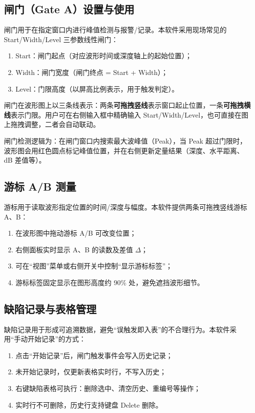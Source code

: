 \subsection{闸门（Gate A）设置与使用}
\par
闸门用于在指定窗口内进行峰值检测与报警/记录。本软件采用现场常见的 Start/Width/Level 三参数线性闸门：
\begin{enumerate}
	\item Start：闸门起点（对应波形时间或深度轴上的起始位置）；
	\item Width：闸门宽度（闸门终点 = Start + Width）；
	\item Level：门限高度（以屏高比例表示，用于触发判定）。
\end{enumerate}
\par
闸门在波形图上以三条线表示：两条\textbf{可拖拽竖线}表示窗口起止位置，一条\textbf{可拖拽横线}表示门限。用户可在右侧输入框中精确输入 Start/Width/Level，也可直接在图上拖拽调整，二者会自动联动。
\par
闸门检测逻辑为：在闸门窗口内搜索最大波峰值（Peak），当 Peak 超过门限时，波形图会用红色圆点标记峰值位置，并在右侧更新定量结果（深度、水平距离、dB 差值等）。


\subsection{游标 A/B 测量}
\par
游标用于读取波形指定位置的时间/深度与幅度。本软件提供两条可拖拽竖线游标 A、B：
\begin{enumerate}
	\item 在波形图中拖动游标 A/B 可改变位置；
	\item 右侧面板实时显示 A、B 的读数及差值 $\Delta$；
	\item 可在“视图”菜单或右侧开关中控制“显示游标标签”；
	\item 游标标签固定显示在图形高度约 90\% 处，避免遮挡波形细节。
\end{enumerate}


\subsection{缺陷记录与表格管理}
\par
缺陷记录用于形成可追溯数据，避免“误触发即入表”的不合理行为。本软件采用“手动开始记录”的方式：
\begin{enumerate}
	\item 点击“开始记录”后，闸门触发事件会写入历史记录；
	\item 未开始记录时，仅更新表格实时行，不写入历史；
	\item 右键缺陷表格可执行：删除选中、清空历史、重编号等操作；
	\item 实时行不可删除，历史行支持键盘 Delete 删除。
\end{enumerate}

